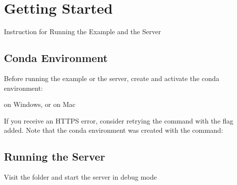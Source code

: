 \documentclass[letterpaper,10pt,english]{sphinxmanual}
\begin{document}
\chapter{Getting Started}
\label{\detokenize{doc-src/getting-started:getting-started}}\label{\detokenize{doc-src/getting-started::doc}}
Instruction for Running the Example and the Server


\section{Conda Environment}
\label{\detokenize{doc-src/getting-started:conda-environment}}
Before running the example or the server, create and activate the conda
environment:

\begin{sphinxVerbatim}[commandchars=\\\{\}]
    \PYGZbs{}
  
\end{sphinxVerbatim}

on Windows, or on Mac

\begin{sphinxVerbatim}[commandchars=\\\{\}]
    
  
\end{sphinxVerbatim}

If you receive an HTTPS error, consider retrying the command with the  flag added.
Note that the conda environment was created with the command:

\begin{sphinxVerbatim}[commandchars=\\\{\}]
              
\end{sphinxVerbatim}


\section{Running the Server}
\label{\detokenize{doc-src/getting-started:running-the-server}}
Visit the folder  and start the server in debug mode
\end{document}
